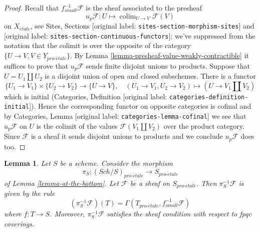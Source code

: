 \documentclass[10pt,a4paper]{article}
\theoremstyle{plain}
\newtheorem{lemma}[subsection]{Lemma}
\theoremstyle{definition}
\theoremstyle{remark}
\numberwithin{equation}{subsection}
\def\colim{\mathop{\mathrm{colim}}\nolimits}
\def\Sch{\mathit{Sch}}
\def\proetale{{pro\text{-}\acute{e}tale}}
\def\etale{{\acute{e}tale}}
\begin{document}
\begin{proof}
Recall that $f_{small}^{-1}\mathcal{F}$ is the sheaf associated to the
presheaf
$$
u_p\mathcal{F} : U \mapsto \colim_{U \to V} \mathcal{F}(V)
$$
on $X_\etale$, see Sites, Sections \textnormal{[original label: \nolinkurl{sites-section-morphism-sites}]} and
\textnormal{[original label: \nolinkurl{sites-section-continuous-functors}]}; we've suppressed from the notation
that the colimit is over the opposite of the category
$\{U \to V, V \in Y_\proetale\}$. By
Lemma \ref{lemma-presheaf-value-weakly-contractible}
it suffices to prove that $u_p\mathcal{F}$ sends finite disjoint unions
to products.
Suppose that $U = U_1 \amalg U_2$ is a disjoint union of open and closed
subschemes. There is a functor
$$
\{U_1 \to V_1\} \times \{U_2 \to V_2\} \longrightarrow
\{U \to V\},\quad
(U_1 \to V_1, U_2 \to V_2) \longmapsto (U \to V_1 \amalg V_2)
$$
which is initial (Categories, Definition \textnormal{[original label: \nolinkurl{categories-definition-initial}]}).
Hence the corresponding functor on opposite categories is cofinal and
by Categories, Lemma \textnormal{[original label: \nolinkurl{categories-lemma-cofinal}]} we see
that $u_p\mathcal{F}$ on $U$ is the colimit of the values
$\mathcal{F}(V_1 \amalg V_2)$ over the product category.
Since $\mathcal{F}$ is a sheaf it sends disjoint unions to products and
we conclude $u_p\mathcal{F}$ does too.
\end{proof}

\begin{lemma}
\label{lemma-describe-pullback}
Let $S$ be a scheme. Consider the morphism
$$
\pi_S : (\Sch/S)_\proetale \longrightarrow S_\proetale
$$
of Lemma \ref{lemma-at-the-bottom}. Let $\mathcal{F}$ be a sheaf on
$S_\proetale$. Then $\pi_S^{-1}\mathcal{F}$ is given by the rule
$$
(\pi_S^{-1}\mathcal{F})(T) = \Gamma(T_\proetale, f_{small}^{-1}\mathcal{F})
$$
where $f : T \to S$. Moreover, $\pi_S^{-1}\mathcal{F}$ satisfies the
sheaf condition with respect to fpqc coverings.
\end{lemma}
\end{document}
